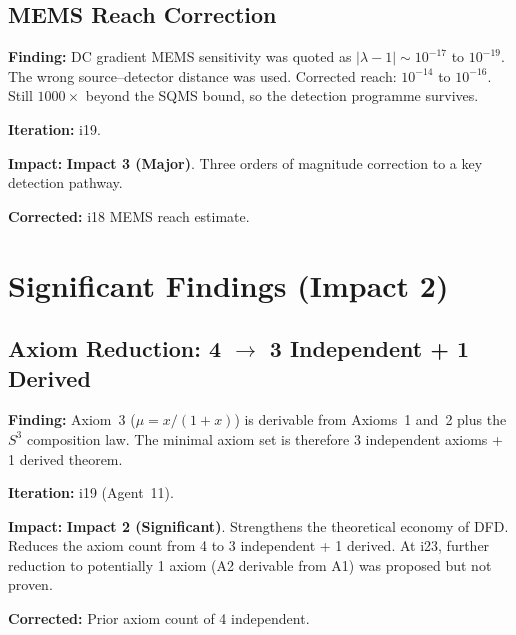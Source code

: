 \documentclass[11pt,a4paper]{article}
\newcommand{\impthree}{\textcolor{impact3}{\textbf{Impact 3 (Major)}}}
\newcommand{\imptwo}{\textcolor{impact2}{\textbf{Impact 2 (Significant)}}}
\begin{document}
\subsection{MEMS Reach Correction}
\label{sec:mems-reach}

\begin{tcolorbox}[colback=orange!5!white, colframe=orange!70!black,
  title=\textbf{MEMS Reach: $10^{-17}$--$10^{-19}$ $\to$ $10^{-14}$--$10^{-16}$ --- Iteration 19}]

\textbf{Finding:} DC gradient MEMS sensitivity was quoted as
$|\lambda - 1| \sim 10^{-17}$ to $10^{-19}$. The wrong source--detector
distance was used. Corrected reach: $10^{-14}$ to $10^{-16}$. Still
$1000\times$ beyond the SQMS bound, so the detection programme survives.

\textbf{Iteration:} i19.

\textbf{Impact:} \impthree. Three orders of magnitude correction to a
key detection pathway.

\textbf{Corrected:} i18 MEMS reach estimate.

\end{tcolorbox}


\section{Significant Findings (Impact 2)}
\label{sec:impact2}

\subsection{Axiom Reduction: 4 $\to$ 3 Independent + 1 Derived}
\label{sec:axiom-reduction}

\begin{tcolorbox}[colback=green!5!white, colframe=green!50!black,
  title=\textbf{Axiom 3 Derived from Axioms 1+2 --- Iteration 19}]

\textbf{Finding:} Axiom~3 ($\mu = x/(1+x)$) is derivable from Axioms~1
and~2 plus the $S^3$ composition law. The minimal axiom set is therefore
3 independent axioms + 1 derived theorem.

\textbf{Iteration:} i19 (Agent~11).

\textbf{Impact:} \imptwo. Strengthens the theoretical economy of DFD.
Reduces the axiom count from 4 to 3 independent + 1 derived. At i23,
further reduction to potentially 1 axiom (A2 derivable from A1) was
proposed but not proven.

\textbf{Corrected:} Prior axiom count of 4 independent.

\end{tcolorbox}
\end{document}
